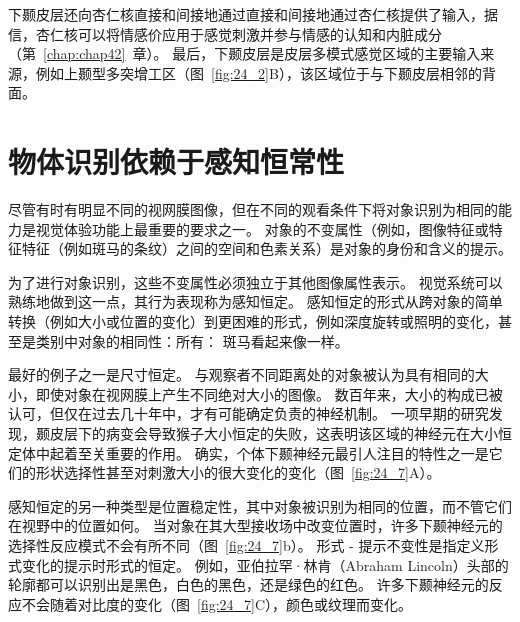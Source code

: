 下颞皮层还向杏仁核直接和间接地通过直接和间接地通过杏仁核提供了输入，据信，杏仁核可以将情感价应用于感觉刺激并参与情感的认知和内脏成分（第~\ref{chap:chap42}~章）。
最后，下颞皮层是皮层多模式感觉区域的主要输入来源，例如上颞型多突增工区（图~\ref{fig:24_2}B），该区域位于与下颞皮层相邻的背面。



\section{物体识别依赖于感知恒常性}

尽管有时有明显不同的视网膜图像，但在不同的观看条件下将对象识别为相同的能力是视觉体验功能上最重要的要求之一。
对象的不变属性（例如，图像特征或特征特征（例如斑马的条纹）之间的空间和色素关系）是对象的身份和含义的提示。


为了进行对象识别，这些不变属性必须独立于其他图像属性表示。
视觉系统可以熟练地做到这一点，其行为表现称为感知恒定。
感知恒定的形式从跨对象的简单转换（例如大小或位置的变化）到更困难的形式，例如深度旋转或照明的变化，甚至是类别中对象的相同性：所有： 斑马看起来像一样。


最好的例子之一是尺寸恒定。
与观察者不同距离处的对象被认为具有相同的大小，即使对象在视网膜上产生不同绝对大小的图像。
数百年来，大小的构成已被认可，但仅在过去几十年中，才有可能确定负责的神经机制。
一项早期的研究发现，颞皮层下的病变会导致猴子大小恒定的失败，这表明该区域的神经元在大小恒定体中起着至关重要的作用。
确实，个体下颞神经元最引人注目的特性之一是它们的形状选择性甚至对刺激大小的很大变化的变化（图~\ref{fig:24_7}A）。


感知恒定的另一种类型是位置稳定性，其中对象被识别为相同的位置，而不管它们在视野中的位置如何。
当对象在其大型接收场中改变位置时，许多下颞神经元的选择性反应模式不会有所不同（图~\ref{fig:24_7}b）。
形式 - 提示不变性是指定义形式变化的提示时形式的恒定。
例如，亚伯拉罕·林肯（Abraham Lincoln）头部的轮廓都可以识别出是黑色，白色的黑色，还是绿色的红色。 
许多下颞神经元的反应不会随着对比度的变化（图~\ref{fig:24_7}C），颜色或纹理而变化。


